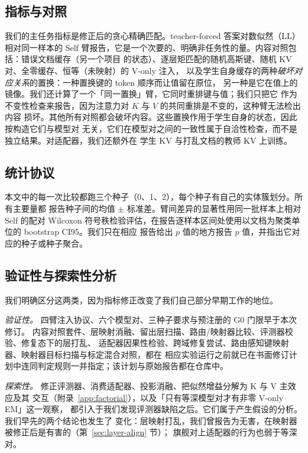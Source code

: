 \documentclass[11pt]{article}
\begin{document}
\subsection{指标与对照}
\label{sec:metrics}
我们的主任务指标是修正后的贪心精确匹配。teacher-forced 答案对数似然（LL）相对同一样本的
Self 臂报告，它是一个次要的、明确非任务性的量。内容对照包括：错误文档缓存（另一个项目
的状态）、逐层矩匹配的随机高斯键、随机 KV 对、全零缓存、恒等（未映射）的 V-only 注入，
以及学生自身缓存的两种\emph{破坏对应关系}的置换：一种置换键的 token 顺序而让值留在原位，
另一种是它在值上的镜像。我们还计算了一个「同一置换」臂，它同时重排键与值；我们只把它
作为不变性检查来报告，因为注意力对 $K$ 与 $V$ 的共同重排是不变的，这种臂无法检出内容
损坏。其他所有对照都会破坏内容。这些置换作用于学生自身的状态，因此按构造它们与模型对
无关，它们在模型对之间的一致性属于自洽性检查，而不是独立结果。对适配器，我们还额外在
学生 KV 与打乱文档的教师 KV 上训练。

\subsection{统计协议}
\label{sec:stats-protocol}
本文中的每一次比较都跑三个种子（0、1、2），每个种子有自己的实体簇划分。所有主要量都
报告种子间的均值 $\pm$ 标准差。臂间差异的显著性用同一批样本上相对 Self 的配对 Wilcoxon
符号秩检验评估，在报告逐样本区间处使用以文档为聚类单位的 bootstrap CI95。我们只在相应
报告给出 $p$ 值的地方报告 $p$ 值，并指出它对应的种子或种子聚合。

\subsection{验证性与探索性分析}
\label{sec:analyses}
我们明确区分这两类，因为指标修正改变了我们自己部分早期工作的地位。

\emph{验证性。} 四臂注入协议、六个模型对、三种子要求与预注册的 G0 门限早于本次修订。
内容对照套件、层映射消融、留出层扫描、路由/映射器比较、评测器校验、修复态下的层打乱、
适配器因果性检验、跨域修复尝试、路由感知键映射器、映射器目标扫描与标定混合对照，都在
相应实验运行之前就已在书面修订计划中连同判定规则一并指定；该计划与原始报告都在仓库中。

\emph{探索性。} 修正评测器、消费适配器、投影消融、把似然增益分解为 K 与 V 主效应及其
交互（附录~\ref{app:factorial}），以及「只有等深模型对才有非零 V-only EM」这一观察，
都引入于我们发现评测器缺陷之后。它们属于产生假设的分析。我们早先的两个结论也发生了
变化：层映射打乱，我们曾报告为无害，在映射器被修正后是有害的（第~\ref{sec:layer-align} 节）；
旗舰对上适配器的行为也弱于等深对。
\end{document}
